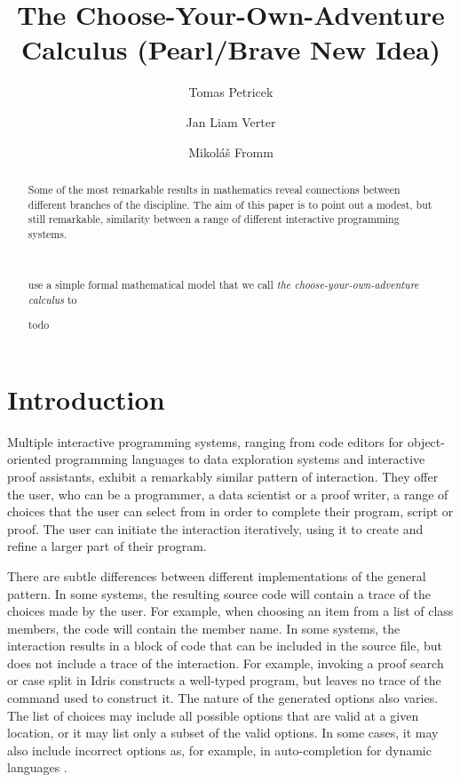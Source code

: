 \documentclass[a4paper,UKenglish,cleveref, autoref, thm-restate]{lipics-v2021}
\title{The Choose-Your-Own-Adventure Calculus (Pearl/Brave New Idea)}
\author{Tomas Petricek}{Charles University, Prague, Czechia}{tomas@tomasp.net}{0000-0002-7242-2208}{}
\author{Jan Liam Verter}{Charles University, Prague, Czechia}{todo@todo}{}{}
\author{Mikoláš Fromm}{Charles University, Prague, Czechia}{todo@todo}{}{}
\begin{document}
\maketitle

\begin{abstract}

Some of the most remarkable results in mathematics reveal connections between different
branches of the discipline. The aim of this paper is to point out a modest, but still
remarkable, similarity between a range of different interactive programming systems.

~

use a simple formal mathematical model
that we call \emph{the choose-your-own-adventure calculus} to


todo


\end{abstract}

\newpage

\section{Introduction}

Multiple interactive programming systems, ranging from code editors for object-oriented programming
languages to data exploration systems and interactive proof assistants, exhibit a remarkably
similar pattern of interaction. They offer the user, who can be a programmer, a data scientist
or a proof writer, a range of choices that the user can select from in order to complete their
program, script or proof. The user can initiate the interaction iteratively, using it to
create and refine a larger part of their program.

There are subtle differences between different implementations of the general pattern. In some
systems, the resulting source code will contain a trace of the choices made by the user.
For example, when choosing an item from a list of class members, the code will contain the member
name. In some systems, the interaction results in a block of code that can be included in the
source file, but does not include a trace of the interaction. For example, invoking a proof search
or case split in Idris \cite{brady-2015-idris} constructs a well-typed program, but leaves no trace
of the command used to construct it.
%
The nature of the generated options also varies. The list of choices may include all possible
options that are valid at a given location, or it may list only a subset of the valid options.
In some cases, it may also include incorrect options as, for example, in auto-completion
for dynamic languages \cite{frolich-2024-autocomplete}.
\end{document}
